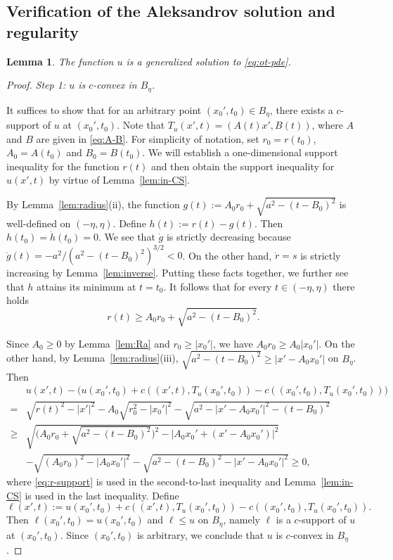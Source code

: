 \documentclass[12pt,letterpaper]{amsart}
\theoremstyle{definition}
\theoremstyle{plain}
\newtheorem{lemma}[definition]{Lemma}
\numberwithin{equation}{section}
\begin{document}
\subsection{Verification of the Aleksandrov solution and regularity}\label{ss:verify}

\begin{lemma}\label{lem:gs}
    The function $u$ is a generalized solution to \eqref{eq:ot-pde}.
\end{lemma}
\begin{proof}
    {\it Step 1: $u$ is $c$-convex in $B_\eta$.}

    It suffices to show that for an arbitrary point $(x_0',t_0)\in B_\eta$,
    there exists a $c$-support of $u$ at $(x_0',t_0)$.
    Note that $T_u(x',t)=(A(t)x',B(t))$, where $A$ and $B$ are given in \eqref{eq:A-B}.
    For simplicity of notation, set $r_0=r(t_0)$, $A_0=A(t_0)$ and $B_0=B(t_0)$.
    We will establish a one-dimensional support inequality for the function $r(t)$ and then obtain the support inequality for $u(x',t)$ by virtue of Lemma~\ref{lem:in-CS}.

    By Lemma~\ref{lem:radius}(ii), the function $g(t):=A_0r_0+\sqrt{a^2-(t-B_0)^2}$ is well-defined on $(-\eta,\eta)$.
    Define $h(t):=r(t)-g(t)$.
    Then $h(t_0)=\dot{h}(t_0)=0$.
    We see that $\dot{g}$ is strictly decreasing because $\ddot{g}(t)=-a^2/(a^2-(t-B_0)^2)^{3/2}<0$.
    On the other hand, $\dot{r}=s$ is strictly increasing by Lemma~\ref{lem:inverse}.
    Putting these facts together, we further see that $h$ attains its minimum at $t=t_0$.
    It follows that for every $t\in(-\eta,\eta)$ there holds
    \begin{equation}\label{eq:r-support}
        r(t)\geq A_0r_0+\sqrt{a^2-(t-B_0)^2}.
    \end{equation}

    Since $A_0\geq0$ by Lemma~\ref{lem:Ra} and $r_0\geq|x_0'|$, we have $A_0r_0\geq A_0|x_0'|$.
    On the other hand, by Lemma~\ref{lem:radius}(iii), $\sqrt{a^2-(t-B_0)^2}\geq|x'-A_0x_0'|$ on $B_\eta$.
    Then
    \begin{align*}
       &u(x',t)-\Big(u(x_0',t_0)+c((x',t),T_u(x_0',t_0))-c((x_0',t_0),T_u(x_0',t_0))\Big)\\
       =&\sqrt{r(t)^2-|x'|^2}-A_0\sqrt{r_0^2-|x_0'|^2}-\sqrt{a^2-|x'-A_0x_0'|^2-(t-B_0)^2}\\
       \geq&\sqrt{\Big(A_0r_0+\sqrt{a^2-(t-B_0)^2}\Big)^2-|A_0x_0'+(x'-A_0x_0')|^2}\\
       &-\sqrt{(A_0r_0)^2-|A_0x_0'|^2}-\sqrt{a^2-(t-B_0)^2-|x'-A_0x_0'|^2}\geq0,
    \end{align*}
    where \eqref{eq:r-support} is used in the second-to-last inequality and Lemma~\ref{lem:in-CS} is used in the last inequality.
    Define
    \[
    \ell(x',t):=u(x_0',t_0)+c((x',t),T_u(x_0',t_0))-c((x_0',t_0),T_u(x_0',t_0)).
    \]
    Then $\ell(x_0',t_0)=u(x_0',t_0)$ and $\ell\leq u$ on $B_\eta$, namely $\ell$ is a $c$-support of $u$ at $(x_0',t_0)$.
    Since $(x_0',t_0)$ is arbitrary, we conclude that $u$ is $c$-convex in $B_\eta$.


\end{proof}
\end{document}
